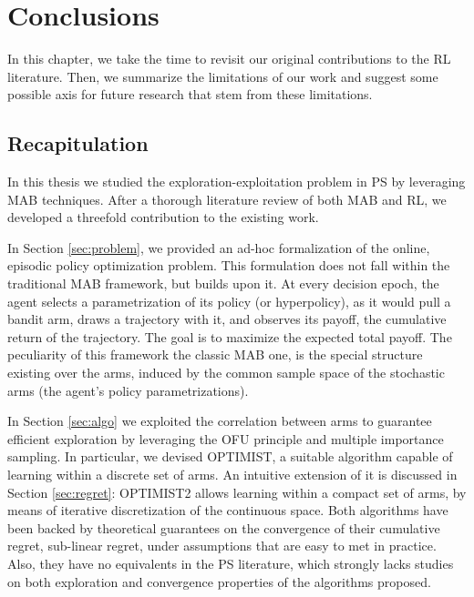 
\chapter{Conclusions} \label{ch:conclusions}
In this chapter, we take the time to revisit our original contributions to the \gls{RL} literature. Then, we summarize the limitations of our work and suggest some possible
axis for future research that stem from these limitations.


\section{Recapitulation}
In this thesis we studied the exploration-exploitation problem in \gls{PS} by leveraging \gls{MAB} techniques. After a thorough literature review of both \gls{MAB} and \gls{RL}, we developed a threefold contribution to the existing work.

In Section \ref{sec:problem}, we provided an ad-hoc formalization of the online, episodic policy optimization problem. This formulation does not fall within the traditional \gls{MAB} framework, but builds upon it. At every decision epoch, the agent selects a parametrization of its policy (or hyperpolicy), as it would pull a bandit arm, draws a trajectory with it, and observes its payoff, \ie the cumulative return of the trajectory. The goal is to maximize the expected total payoff. The peculiarity of this framework \wrt the classic \gls{MAB} one, is the special structure existing over the arms, induced by the common sample space of the stochastic arms (the agent's policy parametrizations).

In Section \ref{sec:algo} we exploited the correlation between arms to guarantee efficient exploration by leveraging the \gls{OFU} principle and multiple importance sampling. In particular, we devised \gls{OPTIMIST}, a suitable algorithm capable of learning within a discrete set of arms. An intuitive extension of it is discussed in Section \ref{sec:regret}: \gls{OPTIMIST}2 allows learning within a compact set of arms, by means of iterative discretization of the continuous space. Both algorithms have been backed by theoretical guarantees on the convergence of their cumulative regret, \ie sub-linear regret, under assumptions that are easy to met in practice. Also, they have no equivalents in the \gls{PS} literature, which strongly lacks studies on both exploration and convergence properties of the algorithms proposed.

